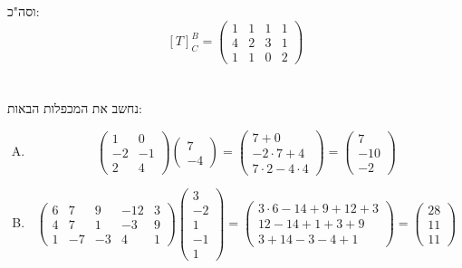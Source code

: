 \documentclass[]{article}
\newcommand\pms[1]    {\begin{pmatrix}
		#1
\end{pmatrix}}
\begin{document}
\begin{enumerate}[A)]
		וסה"כ: 
		\[ [T]_C^B = \pms{1 & 1 & 1 & 1 \\ 4 & 2 & 3 & 1 \\ 1 & 1 & 0 & 2} \]
	\end{enumerate}
	
	\section{}
	נחשב את המכפלות הבאות: 
	\begin{enumerate}[A.]
		\item 
		\[ \pms{1 & 0 \\ -2 & -1 \\ 2 & 4}\pms{7 \\ -4} = \pms{7 + 0 \\ -2 \cdot 7 + 4 \\ 7 \cdot 2 - 4 \cdot 4} = \pms{7 \\ -10 \\ -2} \]
		\item 
		\[ \pms{6 & 7 & 9 & -12 & 3 \\ 4 & 7 & 1 & -3 & 9 \\ 1 & -7 & -3 & 4 & 1}\pms{3 \\ -2 \\ 1 \\ -1 \\ 1} = \pms{3 \cdot 6 -14  +9 + 12 + 3 \\ 12 -14 + 1 + 3 + 9 \\ 3 + 14 -3 -4 + 1} = \pms{28 \\ 11 \\ 11} \]
	\end{enumerate}
	
\end{document}
